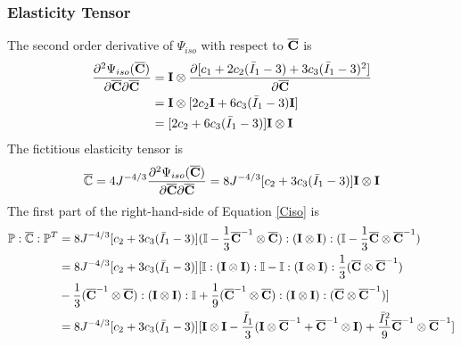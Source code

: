 %
\subsubsection{Elasticity Tensor}
The second order derivative of $\Psi_{iso}$ with respect to $\overline{\bold{C}}$ is
\begin{equation}
\begin{split}
\frac{\partial^2\Psi_{iso}(\overline{\bold{C}})}{\partial\overline{\bold{C}}\partial\overline{\bold{C}}} &= 
\bold{I} \otimes \frac{\partial[c_1 + 2c_2({\bar{I}}_1-3) + 3c_3({\bar{I}}_1-3)^2 ]}{\partial{\overline{\bold{C}}}} \\
&= \bold{I} \otimes [2c_2\bold{I} + 6c_3({\bar{I}}_1-3)\bold{I}]\\
&= [2c_2 + 6c_3({\bar{I}}_1-3)] \bold{I} \otimes \bold{I}
\end{split}
\end{equation}
The fictitious elasticity tensor is
\begin{equation}
\overline{\mathbb{C}} = 4J^{-4/3}\frac{\partial^2\Psi_{iso}(\overline{\bold{C}})}{\partial{\overline{\bold{C}}}{\partial{\overline{\bold{C}}}}} = 8J^{-4/3}[c_2 + 3c_3({\bar{I}}_1 - 3) ]\bold{I} \otimes \bold{I}
\end{equation}
The first part of the right-hand-side of Equation \ref{Ciso} is
\begin{equation} \label{ypart1}
\begin{split}
\mathbb{P} : \overline{\mathbb{C}} : {\mathbb{P}}^T &= 8J^{-4/3}[c_2 + 3c_3({\bar{I}}_1 - 3 )](\mathbb{I} - \frac{1}{3}{\overline{\bold{C}}}^{-1} \otimes {\overline{\bold{C}}}) : (\bold{I} \otimes \bold{I}): (\mathbb{I} - \frac{1}{3}{\overline{\bold{C}}} \otimes {\overline{\bold{C}}}^{-1}) \\
&= 8J^{-4/3}[c_2 + 3c_3({\bar{I}}_1 - 3 )][\mathbb{I}:(\bold{I} \otimes \bold{I}):\mathbb{I} - \mathbb{I}:(\bold{I} \otimes \bold{I}): \frac{1}{3} ({\overline{\bold{C}}} \otimes {\overline{\bold{C}}}^{-1}) \\
&- \frac{1}{3} ({\overline{\bold{C}}}^{-1} \otimes {\overline{\bold{C}}}) : (\bold{I} \otimes \bold{I}) : \mathbb{I} +  \frac{1}{9} ({\overline{\bold{C}}}^{-1} \otimes {\overline{\bold{C}}}) : (\bold{I} \otimes \bold{I}) : ({\overline{\bold{C}}} \otimes {\overline{\bold{C}}}^{-1}) ] \\
&= 8J^{-4/3}[c_2 + 3c_3({\bar{I}}_1 - 3 )] [\bold{I} \otimes \bold{I} - \frac{{\bar{I}}_1}{3}(\bold{I} \otimes {\overline{\bold{C}}}^{-1} +{\overline{\bold{C}}}^{-1}  \otimes  \bold{I}) + \frac{{{\bar{I}}_1}^2}{9} {\overline{\bold{C}}}^{-1} \otimes {\overline{\bold{C}}}^{-1} ]
\end{split}
\end{equation}
